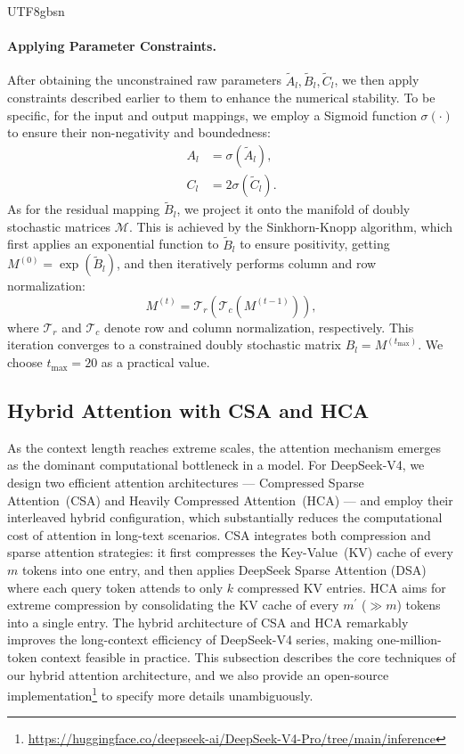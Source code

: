 \documentclass[11pt, a4paper, logo, copyright, nonumbering]{deepseek}
\newcommand{\dsviv}{DeepSeek-V4}
\newcommand{\hcafull}{Heavily Compressed Attention}
\newcommand{\hca}{HCA}
\newcommand{\csafull}{Compressed Sparse Attention}
\newcommand{\csa}{CSA}
\newcommand{\dsafull}{DeepSeek Sparse Attention}
\newcommand{\dsa}{DSA}
\begin{document}
\begin{CJK*}{UTF8}{gbsn}
\paragraph{Applying Parameter Constraints.}
After obtaining the unconstrained raw parameters $\tilde{A}_l, \tilde{B}_l, \tilde{C}_l$, we then apply constraints described earlier to them to enhance the numerical stability. 
To be specific, for the input and output mappings, we employ a Sigmoid function $\sigma(\cdot)$ to ensure their non-negativity and boundedness:
\begin{align}
    A_l &= \sigma(\tilde{A}_l), \\
    C_l &= 2\sigma(\tilde{C}_l).
\end{align}
As for the residual mapping $\tilde{B}_l$, we project it onto the manifold of doubly stochastic matrices $\mathcal{M}$. 
This is achieved by the Sinkhorn-Knopp algorithm, which first applies an exponential function to $\tilde{B}_l$ to ensure positivity, getting $M^{(0)} = \exp(\tilde{B}_l)$, and then iteratively performs column and row normalization:
\begin{equation}
    M^{(t)} = \mathcal{T}_r(\mathcal{T}_c(M^{(t-1)})),
\end{equation}
where $\mathcal{T}_r$ and $\mathcal{T}_c$ denote row and column normalization, respectively. 
This iteration converges to a constrained doubly stochastic matrix $B_l = M^{(t_{\text{max}})}$. 
We choose $t_{\text{max}} = 20$ as a practical value.

\subsection{Hybrid Attention with \csa{} and \hca{}}

As the context length reaches extreme scales, the attention mechanism emerges as the dominant computational bottleneck in a model.
For \dsviv{}, we design two efficient attention architectures --- \csafull{}~(\csa{}) and \hcafull{}~(\hca{}) --- and employ their interleaved hybrid configuration, which substantially reduces the computational cost of attention in long-text scenarios. 
\csa{} integrates both compression and sparse attention strategies: it first compresses the Key-Value~(KV) cache of every $m$ tokens into one entry, and then applies \dsafull{} (\dsa{})~\citep{dsv32} where each query token attends to only $k$ compressed KV entries.
\hca{} aims for extreme compression by consolidating the KV cache of every $m^{\prime}$ ($\gg m$) tokens into a single entry. 
The hybrid architecture of \csa{} and \hca{} remarkably improves the long-context efficiency of \dsviv{} series, making one-million-token context feasible in practice. 
This subsection describes the core techniques of our hybrid attention architecture, and we also provide an open-source implementation\footnote{\url{https://huggingface.co/deepseek-ai/DeepSeek-V4-Pro/tree/main/inference}} to specify more details unambiguously. 


\end{CJK*}
\end{document}
